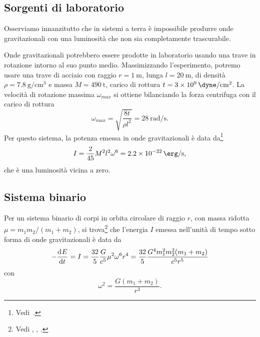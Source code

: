 \subsection{Sorgenti di laboratorio}
\label{sec:sorgenti-laboratorio}

Osserviamo innanzitutto che in sistemi a terra è impossibile produrre onde
gravitazionali con una luminosità che non sia completamente trascurabile.

Onde gravitazionali potrebbero essere prodotte in laboratorio usando una trave
in rotazione intorno al suo punto medio.  Massimizzando l'esperimento, potremo
usare una trave di acciaio con raggio $r = \SI{1}{\metre}$, lunga $l =
\SI{20}{\metre}$, di densità $\rho = \SI{7.8}{\gram\per\centi\metre\cubed}$ e
massa $M = \SI{490}{\tonne}$, carico di rottura $t =
\SI{3e9}{\dyne\per\centi\metre\squared}$.  La velocità di rotazione massima
$\omega_{max}$ si ottiene bilanciando la forza centrifuga con il carico di
rottura
\begin{equation}
  \omega_{max} = \sqrt{\frac{8t}{\rho l^{2}}} = \SI{28}{\radian\per\second}.
\end{equation}
Per questo sistema, la potenza emessa in onde gravitazionali è data
da\footnote{Vedi~\textcite[980]{misner:gravitation}.}
\begin{equation}
  I = \frac{2}{45} M^{2} l^{2} \omega^{6} = \SI{2.2e-22}{\erg\per\second},
\end{equation}
che è una luminosità vicina a zero.

\subsection{Sistema binario}
\label{sec:sistema-binario}

Per un sistema binario di corpi in orbita circolare di raggio $r$, con massa
ridotta $\mu = m_{1}m_{2}/(m_{1} + m_{2})$, si trova\footnote{Vedi
  \textcite[461]{landau:campi}, \textcite[986]{misner:gravitation},
  \textcite[476]{shapiro:black-holes}.}  che l'energia $I$ emessa nell'unità di
tempo sotto forma di onde gravitazionali è data da
\begin{equation}
  \label{eq:potenza-onde-sistema-binario}
  -\frac{{\mathop{}\!\mathrm{d}^{}}E}{\mathop{}\!\mathrm{d} {t}^{}} = I = \frac{32}{5} \frac{G}{c^{5}} \mu^{2} \omega^{6} r^{4} =
  \frac{32}{5} \frac{G^{4} m_{1}^{2} m_{2}^{2} (m_{1} + m_{2})}{c^{5}r^{5}}
\end{equation}
con
\begin{equation}
  \omega^{2} = \frac{G(m_{1} + m_{2})}{r^{3}}.
\end{equation}

